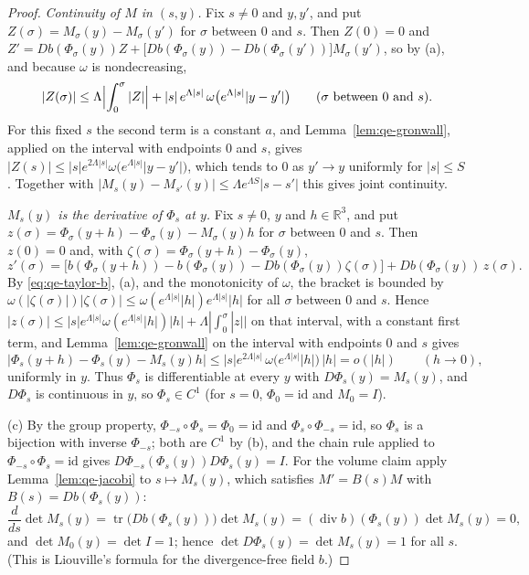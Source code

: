 \documentclass[11pt]{article}
\theoremstyle{definition}
\theoremstyle{plain}
\newcommand{\R}{\mathbb R}
\begin{document}
\begin{proof}
\emph{Continuity of $M$ in $(s,y)$.}  Fix $s\ne0$ and $y,y'$, and put
$Z(\sigma)=M_\sigma(y)-M_\sigma(y')$ for $\sigma$ between $0$ and $s$.
Then $Z(0)=0$ and
$Z'=Db(\Phi_\sigma(y))Z+\bigl[Db(\Phi_\sigma(y))-Db(\Phi_\sigma(y'))\bigr]M_\sigma(y')$,
so by (a), and because $\omega$ is nondecreasing,
\[
 |Z(\sigma)|\le\Lambda\Bigl|\int_0^\sigma|Z|\Bigr|
 +|s|\,e^{\Lambda|s|}\,\omega\bigl(e^{\Lambda|s|}|y-y'|\bigr)
 \qquad(\sigma\text{ between }0\text{ and }s).
\]
For this fixed $s$ the second term is a constant $a$, and
Lemma~\ref{lem:qe-gronwall}, applied on the interval with endpoints $0$ and
$s$, gives
$|Z(s)|\le|s|e^{2\Lambda|s|}\omega\bigl(e^{\Lambda|s|}|y-y'|\bigr)$, which
tends to $0$ as $y'\to y$ uniformly for $|s|\le S$.  Together with
$|M_s(y)-M_{s'}(y)|\le\Lambda e^{\Lambda S}|s-s'|$ this gives joint
continuity.

\emph{$M_s(y)$ is the derivative of $\Phi_s$ at $y$.}  Fix $s\ne0$, $y$ and
$h\in\R^3$, and put $z(\sigma)=\Phi_\sigma(y+h)-\Phi_\sigma(y)-M_\sigma(y)h$
for $\sigma$ between $0$ and $s$.  Then $z(0)=0$ and, with
$\zeta(\sigma)=\Phi_\sigma(y+h)-\Phi_\sigma(y)$,
\[
 z'(\sigma)
 =\bigl[b(\Phi_\sigma(y+h))-b(\Phi_\sigma(y))-Db(\Phi_\sigma(y))\zeta(\sigma)\bigr]
 +Db(\Phi_\sigma(y))\,z(\sigma).
\]
By \eqref{eq:qe-taylor-b}, (a), and the monotonicity of $\omega$, the
bracket is bounded by
$\omega(|\zeta(\sigma)|)|\zeta(\sigma)|\le\omega(e^{\Lambda|s|}|h|)e^{\Lambda|s|}|h|$
for all $\sigma$ between $0$ and $s$.  Hence
$|z(\sigma)|\le|s|e^{\Lambda|s|}\omega(e^{\Lambda|s|}|h|)|h|+\Lambda|\int_0^\sigma|z||$
on that interval, with a constant first term, and
Lemma~\ref{lem:qe-gronwall} on the interval with endpoints $0$ and $s$
gives
\[
 |\Phi_s(y+h)-\Phi_s(y)-M_s(y)h|
 \le|s|e^{2\Lambda|s|}\,\omega\bigl(e^{\Lambda|s|}|h|\bigr)\,|h|=o(|h|)
 \qquad(h\to0),
\]
uniformly in $y$.  Thus $\Phi_s$ is differentiable at every $y$ with
$D\Phi_s(y)=M_s(y)$, and $D\Phi_s$ is continuous in $y$, so $\Phi_s\in C^1$
(for $s=0$, $\Phi_0=\mathrm{id}$ and $M_0=I$).

(c) By the group property, $\Phi_{-s}\circ\Phi_s=\Phi_0=\mathrm{id}$ and
$\Phi_s\circ\Phi_{-s}=\mathrm{id}$, so $\Phi_s$ is a bijection with inverse
$\Phi_{-s}$; both are $C^1$ by (b), and the chain rule applied to
$\Phi_{-s}\circ\Phi_s=\mathrm{id}$ gives $D\Phi_{-s}(\Phi_s(y))D\Phi_s(y)=I$.
For the volume claim apply Lemma~\ref{lem:qe-jacobi} to $s\mapsto M_s(y)$,
which satisfies $M'=B(s)M$ with $B(s)=Db(\Phi_s(y))$:
\[
 \frac d{ds}\det M_s(y)=\operatorname{tr}\bigl(Db(\Phi_s(y))\bigr)\det M_s(y)
 =(\operatorname{div}b)(\Phi_s(y))\det M_s(y)=0 ,
\]
and $\det M_0(y)=\det I=1$; hence $\det D\Phi_s(y)=\det M_s(y)=1$ for all
$s$.  (This is Liouville's formula for the divergence-free field $b$.)


\end{proof}
\end{document}
